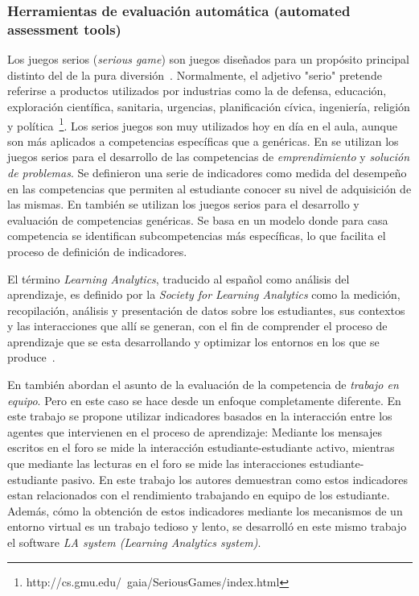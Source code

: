 
\subsubsection{Herramientas de evaluación automática (automated assessment tools)}

Los juegos serios (\emph{serious game}) son juegos diseñados para un propósito principal distinto del de la pura diversión~\cite{djaouti2011classifying}. Normalmente, el adjetivo "serio" pretende referirse a productos utilizados por industrias como la de defensa, educación, exploración científica, sanitaria, urgencias, planificación cívica, ingeniería, religión y política~\footnote{http://cs.gmu.edu/~gaia/SeriousGames/index.html}. Los serios juegos son muy utilizados hoy en día en el aula, aunque son más aplicados a competencias específicas que a genéricas. En \cite{guenaga2013serious} se utilizan los juegos serios para el desarrollo de las competencias de \emph{emprendimiento} y \emph{solución de problemas}. Se definieron una serie de indicadores como medida del desempeño en las competencias que permiten al estudiante conocer su nivel de adquisición de las mismas. En \cite{bedek2011behavioral} también se utilizan los juegos serios para el desarrollo y evaluación de competencias genéricas. Se basa en un modelo donde para casa competencia se identifican subcompetencias más específicas, lo que facilita el proceso de definición de indicadores.

El término \emph{Learning Analytics}, traducido al español como análisis del aprendizaje, es definido por la \emph{Society for Learning Analytics} como la medición, recopilación, análisis y presentación de datos sobre los estudiantes, sus contextos y las interacciones que allí se generan, con el fin de comprender el proceso de aprendizaje que se esta desarrollando y optimizar los entornos en los que se produce~\cite{siemens2012learning}.

En \cite{fidalgo:2015} también abordan el asunto de la evaluación de la competencia de \emph{trabajo en equipo}. Pero en este caso se hace desde un enfoque completamente diferente. En este trabajo se propone utilizar indicadores basados en la interacción entre los agentes que intervienen en el proceso de aprendizaje: Mediante los mensajes escritos en el foro se mide la interacción estudiante-estudiante activo, mientras que mediante las lecturas en el foro se mide las interacciones estudiante-estudiante pasivo. En este trabajo los autores demuestran como estos indicadores estan relacionados con el rendimiento trabajando en equipo de los estudiante. Además, cómo la obtención de estos indicadores mediante los mecanismos de un entorno virtual es un trabajo tedioso y lento, se desarrolló en este mismo trabajo el software \emph{LA system (Learning Analytics system)}.

